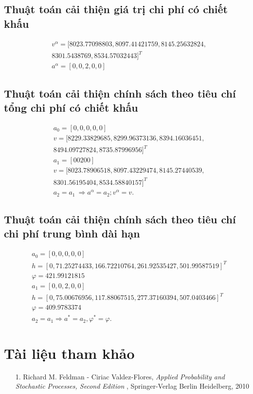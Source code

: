 \documentclass[12pt,a4paper]{report}
\begin{document}
	\section{Thuật toán cải thiện giá trị chi phí có chiết khấu}
	
	\begin{align*}
	&v^\alpha=[8023.77098803, 8097.41421759, 8145.25632824,\\ &8301.5438769,  8534.57032443]^T\\
	&a^\alpha=[0, 0 ,2 ,0, 0]
	\end{align*}

	
	\section{Thuật toán cải thiện chính sách theo tiêu chí tổng chi phí có chiết khấu}
	
	\begin{align*}
	&a_0=[0, 0, 0, 0, 0]\\
	&v=[8229.33829685, 8299.96373136, 8394.16036451,\\ &8494.09727824, 8735.87996956]^T\\
	&a_1=[0 0 2 0 0]\\
	&v=[8023.78906518, 8097.43229474, 8145.27440539,\\ &8301.56195404, 8534.58840157]^T\\
	&a_2=a_1 \ \Rightarrow a^\alpha=a_2; v^\alpha=v.
	\end{align*}

	\section{Thuật toán cải thiện chính sách theo tiêu chí chi phí trung bình dài hạn} 
	\begin{align*}
	&a_0=[0, 0, 0, 0, 0]\\
	&h=[  0     ,    71.25274433 ,166.72210764 ,261.92535427, 501.99587519]^T\\
	&\varphi=421.99121815\\
	&a_1=[0, 0, 2, 0, 0]\\
	&h=[  0        , 75.00676956 ,117.88067515 ,277.37160394, 507.0403466]^T\\
	&\varphi=409.9783374\\
	&a_2=a_1 \Rightarrow a^*=a_2, \varphi^*=\varphi.
	\end{align*}
	\chapter{Tài liệu tham khảo}
	\begin{itemize}
		\item[1.] Richard M. Feldman - Ciriac Valdez-Flores, \textit{Applied Probability and Stochastic Processes, Second Edition} , Springer-Verlag Berlin Heidelberg, 2010
	\end{itemize}
	
\end{document}
